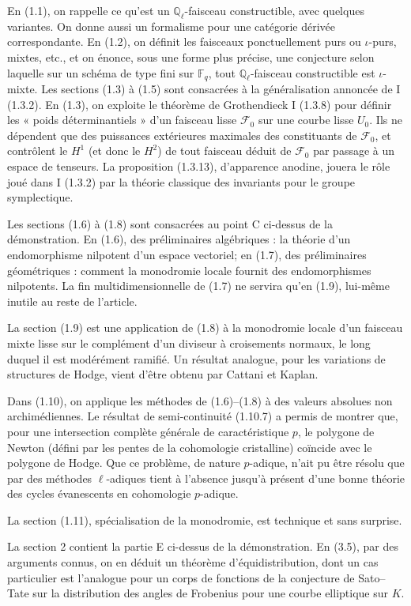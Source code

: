 \documentclass[11pt]{article}
\theoremstyle{remark}
\newcommand{\Ql}{\mathbb{Q}_\ell}
\newcommand{\Fq}{\mathbb{F}_q}
\begin{document}
En (1.1), on rappelle ce qu'est un $\Ql$-faisceau constructible, avec quelques variantes. On donne aussi un formalisme pour une catégorie dérivée correspondante. En (1.2), on définit les faisceaux ponctuellement purs ou $\iota$-purs, mixtes, etc., et on énonce, sous une forme plus précise, une conjecture selon laquelle sur un schéma de type fini sur $\Fq$, tout $\Ql$-faisceau constructible est $\iota$-mixte. Les sections (1.3) à (1.5) sont consacrées à la généralisation annoncée de I (1.3.2). En (1.3), on exploite le théorème de Grothendieck I (1.3.8) pour définir les « poids déterminantiels » d'un faisceau lisse $\mathcal F_0$ sur une courbe lisse $U_0$. Ils ne dépendent que des puissances extérieures maximales des constituants de $\mathcal F_0$, et contrôlent le $H^1$ (et donc le $H^2$) de tout faisceau déduit de $\mathcal F_0$ par passage à un espace de tenseurs. La proposition (1.3.13), d'apparence anodine, jouera le rôle joué dans I (1.3.2) par la théorie classique des invariants pour le groupe symplectique.

Les sections (1.6) à (1.8) sont consacrées au point C ci-dessus de la démonstration. En (1.6), des préliminaires algébriques : la théorie d'un endomorphisme nilpotent d'un espace vectoriel; en (1.7), des préliminaires géométriques : comment la monodromie locale fournit des endomorphismes nilpotents. La fin multidimensionnelle de (1.7) ne servira qu'en (1.9), lui-même inutile au reste de l'article.

La section (1.9) est une application de (1.8) à la monodromie locale d'un faisceau mixte lisse sur le complément d'un diviseur à croisements normaux, le long duquel il est modérément ramifié. Un résultat analogue, pour les variations de structures de Hodge, vient d'être obtenu par Cattani et Kaplan.

Dans (1.10), on applique les méthodes de (1.6)--(1.8) à des valeurs absolues non archimédiennes. Le résultat de semi-continuité (1.10.7) a permis de montrer que, pour une intersection complète générale de caractéristique $p$, le polygone de Newton (défini par les pentes de la cohomologie cristalline) coïncide avec le polygone de Hodge. Que ce problème, de nature $p$-adique, n'ait pu être résolu que par des méthodes $\ell$-adiques tient à l'absence jusqu'à présent d'une bonne théorie des cycles évanescents en cohomologie $p$-adique.

La section (1.11), spécialisation de la monodromie, est technique et sans surprise.

La section 2 contient la partie E ci-dessus de la démonstration. En (3.5), par des arguments connus, on en déduit un théorème d'équidistribution, dont un cas particulier est l'analogue pour un corps de fonctions de la conjecture de Sato--Tate sur la distribution des angles de Frobenius pour une courbe elliptique sur $K$.
\end{document}
